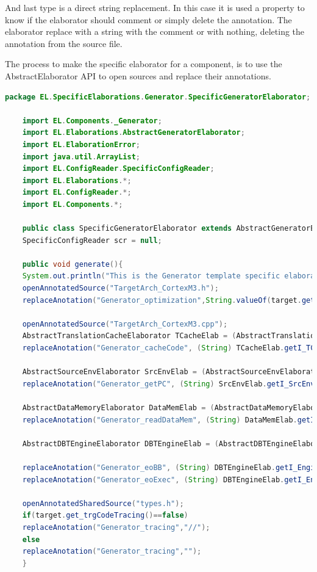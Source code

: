 \documentclass[11pt]{report}
\begin{document}
	And last type is a direct string replacement. In this case it is used a property to know if the elaborator should comment or simply delete the annotation. The elaborator replace with a string with the comment or with nothing, deleting the annotation from the source file.
	
	The process to make the specific elaborator for a component, is to use the AbstractElaborator API to open sources and replace their annotations.
	
	\begin{lstlisting}[language=Java]
	package EL.SpecificElaborations.Generator.SpecificGeneratorElaborator;  
	
	import EL.Components._Generator;
	import EL.Elaborations.AbstractGeneratorElaborator;
	import EL.ElaborationError;
	import java.util.ArrayList;
	import EL.ConfigReader.SpecificConfigReader;
	import EL.Elaborations.*;
	import EL.ConfigReader.*;
	import EL.Components.*;
	
	public class SpecificGeneratorElaborator extends AbstractGeneratorElaborator {
	SpecificConfigReader scr = null;
	
	public void generate(){
	System.out.println("This is the Generator template specific elaboration.");
	openAnnotatedSource("TargetArch_CortexM3.h");
	replaceAnotation("Generator_optimization",String.valueOf(target.get_optimizations()));
	
	openAnnotatedSource("TargetArch_CortexM3.cpp");		
	AbstractTranslationCacheElaborator TCacheElab = (AbstractTranslationCacheElaborator) getElaborator((_TranslationCache) target.get_r_TCache());
	replaceAnotation("Generator_cacheCode", (String) TCacheElab.getI_TCacheElaboratorCacheCode());
	
	AbstractSourceEnvElaborator SrcEnvElab = (AbstractSourceEnvElaborator) getElaborator((_SourceEnv) target.get_r_SrcEnv());
	replaceAnotation("Generator_getPC", (String) SrcEnvElab.getI_SrcEnvElaboratorGetPC());
	
	AbstractDataMemoryElaborator DataMemElab = (AbstractDataMemoryElaborator) getElaborator((_DataMemory) target.get_r_DMem());
	replaceAnotation("Generator_readDataMem", (String) DataMemElab.getI_DMemElaboratorReadDataMem());
	
	AbstractDBTEngineElaborator DBTEngineElab = (AbstractDBTEngineElaborator) getElaborator((_DBTEngine) target.get_r_EngineState());		
	
	replaceAnotation("Generator_eoBB", (String) DBTEngineElab.getI_EngineStateElaboratorEoBB());
	replaceAnotation("Generator_eoExec", (String) DBTEngineElab.getI_EngineStateElaboratorEoExec());
	
	openAnnotatedSharedSource("types.h");
	if(target.get_trgCodeTracing()==false)
	replaceAnotation("Generator_tracing","//");
	else
	replaceAnotation("Generator_tracing","");
	}
	\end{lstlisting}
	
\end{document}
